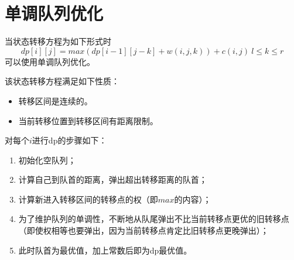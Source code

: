 \section{单调队列优化}
当状态转移方程为如下形式时
\begin{displaymath}
    dp[i][j]=max(dp[i-1][j-k]+w(i,j,k))+c(i,j) ~l \leq k \leq r
\end{displaymath}
可以使用单调队列优化。

该状态转移方程满足如下性质：
\begin{itemize}
	\item 转移区间是连续的。
	\item 当前转移位置到转移区间有距离限制。
\end{itemize}

对每个$i$进行dp的步骤如下：
\begin{enumerate}
	\item 初始化空队列；
	\item 计算自己到队首的距离，弹出超出转移距离的队首；
	\item 计算新进入转移区间的转移点的权（即$max$的内容）；
	\item 为了维护队列的单调性，不断地从队尾弹出不比当前转移点更优的旧转移点
	      （即使权相等也要弹出，因为当前转移点肯定比旧转移点更晚弹出）；
	\item 此时队首为最优值，加上常数后即为dp最优值。
\end{enumerate}

